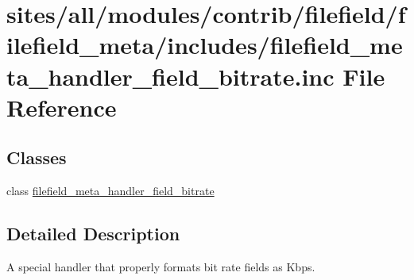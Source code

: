 \hypertarget{filefield__meta__handler__field__bitrate_8inc}{
\section{sites/all/modules/contrib/filefield/filefield\_\-meta/includes/filefield\_\-meta\_\-handler\_\-field\_\-bitrate.inc File Reference}
\label{filefield__meta__handler__field__bitrate_8inc}
}
\subsection*{Classes}
\begin{CompactItemize}
\item 
class \hyperlink{classfilefield__meta__handler__field__bitrate}{filefield\_\-meta\_\-handler\_\-field\_\-bitrate}
\end{CompactItemize}


\subsection{Detailed Description}
A special handler that properly formats bit rate fields as Kbps. 